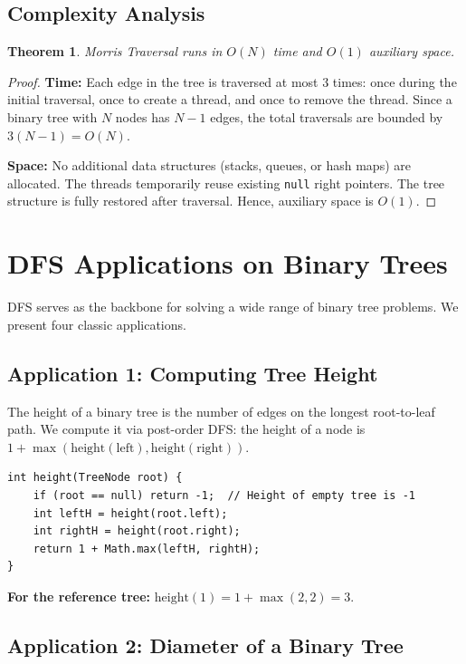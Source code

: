 \documentclass[10pt,journal,compsoc,onecolumn]{IEEEtran}
\newtheorem{theorem}{Theorem}
\begin{document}
\subsection{Complexity Analysis}
\begin{theorem}
Morris Traversal runs in $O(N)$ time and $O(1)$ auxiliary space.
\end{theorem}
\begin{proof}
\textbf{Time:} Each edge in the tree is traversed at most 3 times: once during the initial traversal, once to create a thread, and once to remove the thread. Since a binary tree with $N$ nodes has $N - 1$ edges, the total traversals are bounded by $3(N-1) = O(N)$.

\textbf{Space:} No additional data structures (stacks, queues, or hash maps) are allocated. The threads temporarily reuse existing \texttt{null} right pointers. The tree structure is fully restored after traversal. Hence, auxiliary space is $O(1)$.
\end{proof}

\section{DFS Applications on Binary Trees}
\label{sec:applications}

DFS serves as the backbone for solving a wide range of binary tree problems. We present four classic applications.

\subsection{Application 1: Computing Tree Height}

The height of a binary tree is the number of edges on the longest root-to-leaf path. We compute it via post-order DFS: the height of a node is $1 + \max(\text{height}(\text{left}), \text{height}(\text{right}))$.

\begin{verbatim}
int height(TreeNode root) {
    if (root == null) return -1;  // Height of empty tree is -1
    int leftH = height(root.left);
    int rightH = height(root.right);
    return 1 + Math.max(leftH, rightH);
}
\end{verbatim}

\textbf{For the reference tree:} $\text{height}(1) = 1 + \max(2, 2) = 3$.

\subsection{Application 2: Diameter of a Binary Tree}
\end{document}
